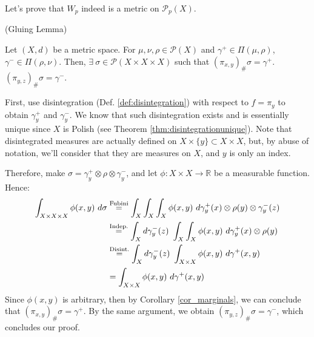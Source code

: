 Let's prove that $W_p$ indeed is a metric on $\mathcal P_p(X)$.

\begin{lemma} (Gluing Lemma)

  Let $(X,d)$ be a metric space. For $\mu,\nu,\rho \in \mathcal P(X)$ and
  $\gamma^+ \in \Pi(\mu,\rho)$, $\gamma^- \in \Pi(\rho,\nu)$. Then,
  $\exists \ \sigma \in \mathcal P(X \times X \times X)$ such that
  $(\pi_{x,y})_\# \sigma  = \gamma^+$.
  $(\pi_{y,z})_\# \sigma  = \gamma^-$.
  \label{lem:gluing}
\end{lemma}
\begin{prf}
  First, use disintegration (Def. \ref{def:disintegration}) with respect to $f = \pi_y$ to obtain $\gamma^+_y$ and $\gamma^-_y$.
  We know that such
  disintegration exists and is essentially unique since $X$ is Polish (see Theorem \ref{thm:disintegrationunique}).
  Note that disintegrated measures are actually
  defined on $X \times \{y\} \subset X \times X$, but, by abuse of notation, we'll consider that they
  are measures on $X$, and $y$ is only an index.

  Therefore, make $\sigma = \gamma_y^+ \otimes \rho \otimes \gamma_y^-$, and let $\phi:X \times X \to \mathbb R$
  be a measurable function.
  Hence:
  \begin{align*}
    \int_{X \times X \times X} \phi(x,y) \ d\sigma & \overset{\text{Fubini}}{=}
    \int_X \int_X \int_X \phi(x,y) \
    d\gamma_y^+(x) \otimes \rho(y) \otimes \gamma_y^-(z)                                        \\
                                                                  & \overset{\text{Indep.}}{=}
    \int_X d\gamma_y^-(z) \ \int_X \int_X \phi(x,y) \
    d\gamma_y^+(x) \otimes \rho(y)                                                              \\
                                                                  & \overset{\text{Disint.}}{=}
    \int_X d\gamma_y^-(z) \ \int_{X \times X} \phi(x,y) \
    d\gamma^+(x,y)                                                                              \\
                                                                  & \overset{\text{\hfill}}{=}
    \int_{X\times X} \phi(x,y) \
    d\gamma^+(x,y)
  \end{align*}
  Since $\phi(x,y)$ is arbitrary, then by Corollary \ref{cor_marginals}, we can conclude that
  $(\pi_{x,y})_\# \sigma  = \gamma^+$. By the same argument, we obtain
  $(\pi_{y,z})_\# \sigma  = \gamma^-$, which concludes our proof.

\end{prf}

